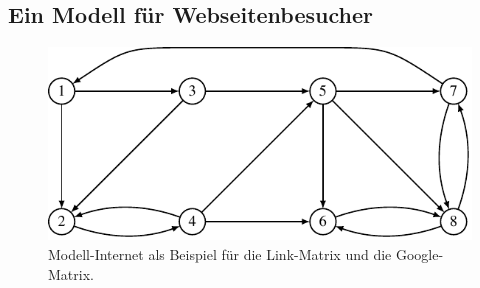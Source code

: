 \subsection{Ein Modell für Webseitenbesucher
\label{buch:subsection:modell-fuer-webseitenbesucher}}
\begin{figure}
\centering
\includegraphics{chapters/80-wahrscheinlichkeit/images/internet.pdf}
\caption{Modell-Internet als Beispiel für die Link-Matrix und die Google-Matrix.
\label{buch:figure:modellinternet}}
\end{figure}

